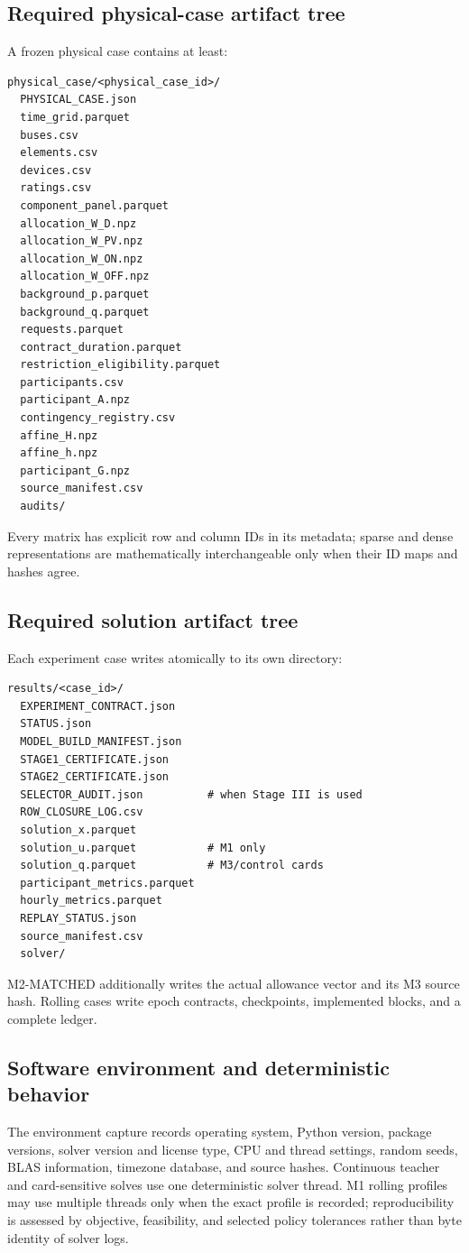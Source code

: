 \documentclass[10pt,journal,onecolumn]{IEEEtran}
\begin{document}
\subsection{Required physical-case artifact tree}

A frozen physical case contains at least:
\begin{verbatim}
physical_case/<physical_case_id>/
  PHYSICAL_CASE.json
  time_grid.parquet
  buses.csv
  elements.csv
  devices.csv
  ratings.csv
  component_panel.parquet
  allocation_W_D.npz
  allocation_W_PV.npz
  allocation_W_ON.npz
  allocation_W_OFF.npz
  background_p.parquet
  background_q.parquet
  requests.parquet
  contract_duration.parquet
  restriction_eligibility.parquet
  participants.csv
  participant_A.npz
  contingency_registry.csv
  affine_H.npz
  affine_h.npz
  participant_G.npz
  source_manifest.csv
  audits/
\end{verbatim}
Every matrix has explicit row and column IDs in its metadata; sparse and dense
representations are mathematically interchangeable only when their ID maps and
hashes agree.

\subsection{Required solution artifact tree}

Each experiment case writes atomically to its own directory:
\begin{verbatim}
results/<case_id>/
  EXPERIMENT_CONTRACT.json
  STATUS.json
  MODEL_BUILD_MANIFEST.json
  STAGE1_CERTIFICATE.json
  STAGE2_CERTIFICATE.json
  SELECTOR_AUDIT.json          # when Stage III is used
  ROW_CLOSURE_LOG.csv
  solution_x.parquet
  solution_u.parquet           # M1 only
  solution_q.parquet           # M3/control cards
  participant_metrics.parquet
  hourly_metrics.parquet
  REPLAY_STATUS.json
  source_manifest.csv
  solver/
\end{verbatim}
M2-MATCHED additionally writes the actual allowance vector and its M3 source
hash. Rolling cases write epoch contracts, checkpoints, implemented blocks,
and a complete ledger.

\subsection{Software environment and deterministic behavior}

The environment capture records operating system, Python version, package
versions, solver version and license type, CPU and thread settings, random
seeds, BLAS information, timezone database, and source hashes. Continuous
teacher and card-sensitive solves use one deterministic solver thread. M1
rolling profiles may use multiple threads only when the exact profile is
recorded; reproducibility is assessed by objective, feasibility, and selected
policy tolerances rather than byte identity of solver logs.
\end{document}
